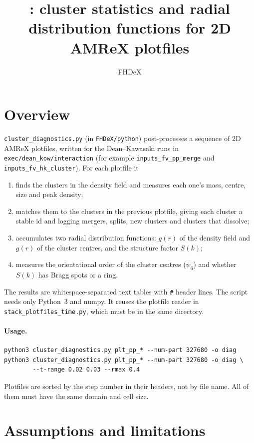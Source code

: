\documentclass[11pt]{article}
\title{\code{cluster\_diagnostics.py}: cluster statistics and radial\\
distribution functions for 2D AMReX plotfiles}
\author{FHDeX}
\date{}
\newcommand{\code}[1]{\texttt{#1}}
\begin{document}
\maketitle

\section{Overview}

\code{cluster\_diagnostics.py} (in \code{FHDeX/python}) post-processes a sequence of
2D AMReX plotfiles, written for the Dean--Kawasaki runs in
\code{exec/dean\_kow/interaction} (for example \code{inputs\_fv\_pp\_merge} and
\code{inputs\_fv\_hk\_cluster}). For each plotfile it
\begin{enumerate}
  \item finds the clusters in the density field and measures each one's mass,
        centre, size and peak density;
  \item matches them to the clusters in the previous plotfile, giving each
        cluster a stable id and logging mergers, splits, new clusters and
        clusters that dissolve;
  \item accumulates two radial distribution functions: $g(r)$ of the density
        field and $g(r)$ of the cluster centres, and the structure factor $S(k)$;
  \item measures the orientational order of the cluster centres ($\psi_6$)
        and whether $S(k)$ has Bragg spots or a ring.
\end{enumerate}
The results are whitespace-separated text tables with \code{\#} header lines.
The script needs only Python~3 and numpy. It reuses the plotfile reader in
\code{stack\_plotfiles\_time.py}, which must be in the same directory.

\paragraph{Usage.}
\begin{verbatim}
python3 cluster_diagnostics.py plt_pp_* --num-part 327680 -o diag
python3 cluster_diagnostics.py plt_pp_* --num-part 327680 -o diag \
        --t-range 0.02 0.03 --rmax 0.4
\end{verbatim}
Plotfiles are sorted by the step number in their headers, not by file name.
All of them must have the same domain and cell size.

\section{Assumptions and limitations}
\end{document}
